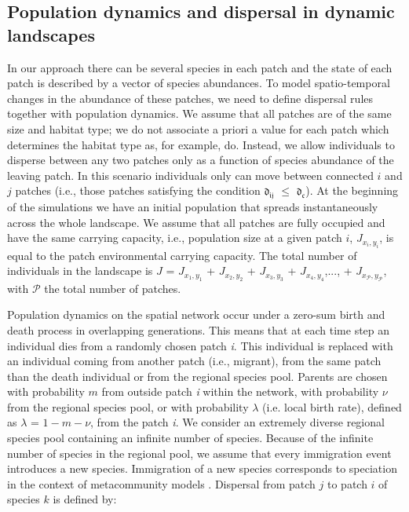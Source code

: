 \documentclass[12pt]{article}
\begin{document}
    \subsection*{Population dynamics and dispersal in dynamic landscapes}
    
    In our approach there can be several species in each patch and the state of each patch is described by a vector of species abundances. To model spatio-temporal changes in the abundance of these patches, we need to define dispersal rules together with population dynamics. We assume that all patches are of the same size and habitat type; we do not associate a priori a value for each patch which determines the habitat type as, for example, \cite{rybickihanski2013} do. Instead, we allow individuals to disperse between any two patches only as a function of species abundance of the leaving patch. In this scenario individuals only can move between connected $i$ and $j$ patches (i.e., those patches satisfying the condition $\mathfrak{d_{ij}}$ $\leq$ $\mathfrak{d_{c}}$). At the beginning of the simulations we have an initial population that spreads instantaneously across the whole landscape. We assume that all patches are fully occupied and have the same carrying capacity, i.e., population size at a given patch $i$, $J_{x_i,y_i}$, is equal to the patch environmental carrying capacity. The total number of individuals in the landscape is $J$ = $J_{x_1,y_1}$ + $J_{x_2,y_2}$ + $J_{x_3,y_3}$ + $J_{x_4,y_4}$,..., + $J_{x_\mathcal{P},y_\mathcal{P}}$, with $\mathcal{P}$ the total number of patches.
    
    Population dynamics on the spatial network occur under a zero-sum birth and death process in overlapping generations. This means that at each time step an individual dies from a randomly chosen patch {\em i}. This individual is replaced with an individual coming from another patch (i.e., migrant), from the same patch than the death individual or from the regional species pool. Parents are chosen with probability $m$ from outside patch {\em i} within the network, with probability $\nu$ from the regional species pool, or with probability $\lambda$ (i.e. local birth rate), defined as $\lambda$ = $1 - m - \nu$, from the patch {\em i}. We consider an extremely diverse regional species pool containing an infinite number of species. Because of the infinite number of species in the regional pool, we assume that every immigration event introduces a new species. Immigration of a new species corresponds to speciation in the context of metacommunity models \cite{Vanpeteghem_Haegeman_2010}. Dispersal from patch $j$ to patch $i$ of species $k$ is defined by:
    
\end{document}
